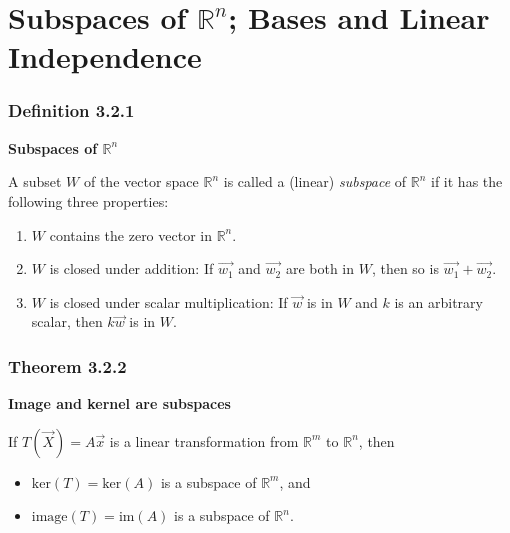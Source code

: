\documentclass{report}
\begin{document}
\section{Subspaces of \texorpdfstring{$\mathbb{R}^{n}$}{R^n}; Bases and Linear Independence}
\subsubsection*{Definition 3.2.1}
\par\noindent\textbf{Subspaces of $\mathbb{R}^{n}$}
\par\noindent A subset $W$ of the vector space $\mathbb{R}^{n}$ is called a (linear) \textit{subspace} of $\mathbb{R}^{n}$ if it has the following three properties:
\renewcommand{\labelenumi}{\textbf{\alph{enumi}.}}
\begin{enumerate}
\item $W$ contains the zero vector in $\mathbb{R}^{n}$.
\item $W$ is closed under addition: If $\vec{w_{1}}$ and $\vec{w_{2}}$ are both in $W$, then so is $\vec{w_{1}}+\vec{w_{2}}$.
\item $W$ is closed under scalar multiplication: If $\vec{w}$ is in $W$ and $k$ is an arbitrary scalar, then $k\vec{w}$ is in $W$.
\end{enumerate}
\subsubsection*{Theorem 3.2.2}
\par\noindent\textbf{Image and kernel are subspaces}
\par\noindent If $T(\vec{X})=A\vec{x}$ is a linear transformation from $\mathbb{R}^{m}$ to $\mathbb{R}^{n}$, then
\begin{itemize}
\item $\textrm{ker}(T)=\textrm{ker}(A)$ is a subspace of $\mathbb{R}^{m}$, and
\item $\textrm{image}(T)=\textrm{im}(A)$ is a subspace of $\mathbb{R}^{n}$.
\end{itemize}
\end{document}
